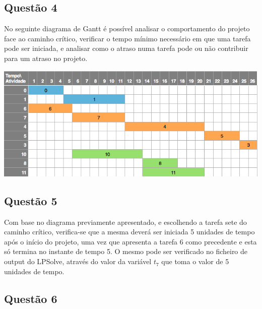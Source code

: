\documentclass[11pt,titlepage,contentspage,a4paper]{article} %
\begin{document}
\subsection{Questão 4}
No seguinte diagrama de Gantt é possível analisar o comportamento do projeto face ao caminho crítico, verificar o tempo mínimo necessário em que uma tarefa pode ser iniciada, e analisar como o atraso numa tarefa pode ou não contribuir para um atraso no projeto.
\begin{center}
\includegraphics[width=\textwidth]{gant1}
\end{center}


\subsection{Questão 5}
Com base no diagrama previamente apresentado, e escolhendo a tarefa sete do caminho crítico, verifica-se que a mesma deverá ser iniciada 5 unidades de tempo após o início do projeto, uma vez que apresenta a tarefa 6 como precedente e esta só termina no instante de tempo 5. 
O mesmo pode ser verificado no ficheiro de output do LPSolve, através do valor da variável $t_7$ que toma o valor de 5 unidades de tempo.

\subsection{Questão 6}
\end{document}
